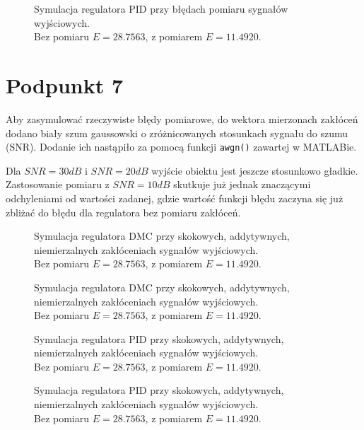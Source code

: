 \begin{figure}[ht]
\centering

\caption{Symulacja regulatora PID przy błędach pomiaru sygnałów wyjściowych.\\Bez pomiaru $ E = \num{28,7563} $, z pomiarem $ E = \num{11,4920} $.}
\label{Z6a}
\end{figure}

\chapter{Podpunkt 7}
Aby zasymulować rzeczywiste błędy pomiarowe, do wektora mierzonach zakłóceń dodano biały szum gaussowski o zróżnicowanych stosunkach sygnału do szumu (SNR). Dodanie ich nastąpiło za pomocą funkcji \verb|awgn()| zawartej w MATLABie.

Dla $ \mathit{SNR} = 30\mathit{dB} $ i $ \mathit{SNR} = 20\mathit{dB} $ wyjście obiektu jest jeszcze stosunkowo gładkie. Zastosowanie pomiaru z $ \mathit{SNR} = 10\mathit{dB} $ skutkuje już jednak znaczącymi odchyleniami od wartości zadanej, gdzie wartość funkcji błędu zaczyna się już zbliżać do błędu dla regulatora bez pomiaru zakłóceń.

\begin{figure}[ht]
\centering

\caption{Symulacja regulatora DMC przy skokowych, addytywnych, niemierzalnych zakłóceniach sygnałów wyjściowych.\\Bez pomiaru $ E = \num{28,7563} $, z pomiarem $ E = \num{11,4920} $.}
\label{Z6a}
\end{figure}

\begin{figure}[ht]
\centering

\caption{Symulacja regulatora DMC przy skokowych, addytywnych, niemierzalnych zakłóceniach sygnałów wyjściowych.\\Bez pomiaru $ E = \num{28,7563} $, z pomiarem $ E = \num{11,4920} $.}
\label{Z6a}
\end{figure}

\begin{figure}[ht]
\centering

\caption{Symulacja regulatora PID przy skokowych, addytywnych, niemierzalnych zakłóceniach sygnałów wyjściowych.\\Bez pomiaru $ E = \num{28,7563} $, z pomiarem $ E = \num{11,4920} $.}
\label{Z6a}
\end{figure}

\begin{figure}[ht]
\centering

\caption{Symulacja regulatora PID przy skokowych, addytywnych, niemierzalnych zakłóceniach sygnałów wyjściowych.\\Bez pomiaru $ E = \num{28,7563} $, z pomiarem $ E = \num{11,4920} $.}
\label{Z6a}
\end{figure}

